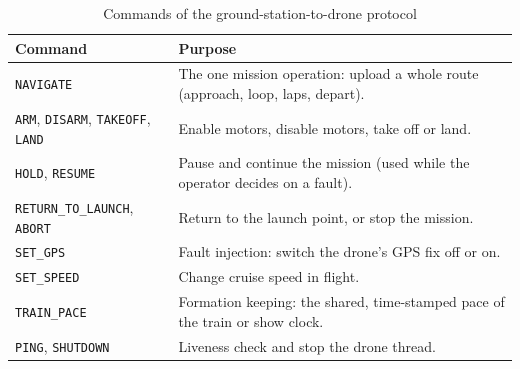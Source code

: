 \documentclass[11pt,a4paper,oneside]{report}
\newcommand{\cmd}[1]{\mbox{\texttt{#1}}}
\begin{document}
\begin{table}[H]
\caption[Run-time commands]{Commands of the ground-station-to-drone protocol}\label{tab:commands}
\small
\begin{tabularx}{\textwidth}{@{}P{0.40\textwidth}Y@{}}
\toprule
\textbf{\normalfont\small Command} & \textbf{Purpose} \\
\midrule
\cmd{NAVIGATE} & The one mission operation: upload a whole route (approach, loop, laps, depart). \\
\cmd{ARM}, \cmd{DISARM}, \cmd{TAKEOFF}, \cmd{LAND} & Enable motors, disable motors, take off or land. \\
\cmd{HOLD}, \cmd{RESUME} & Pause and continue the mission (used while the operator decides on a fault). \\
\cmd{RETURN\_TO\_LAUNCH}, \cmd{ABORT} & Return to the launch point, or stop the mission. \\
\cmd{SET\_GPS} & Fault injection: switch the drone's GPS fix off or on. \\
\cmd{SET\_SPEED} & Change cruise speed in flight. \\
\cmd{TRAIN\_PACE} & Formation keeping: the shared, time-stamped pace of the train or show clock. \\
\cmd{PING}, \cmd{SHUTDOWN} & Liveness check and stop the drone thread. \\
\bottomrule
\end{tabularx}
\end{table}
\end{document}
